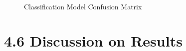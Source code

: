 \documentclass[12pt,a4paper]{report}
\begin{document}
\begin{figure}[h]
	\renewcommand\thefigure{4.3}
	\centering
	\caption{Classification Model Confusion Matrix}
	\label{fig:Conf}
\end{figure}

	
\section*{4.6 Discussion on Results}
\end{document}
